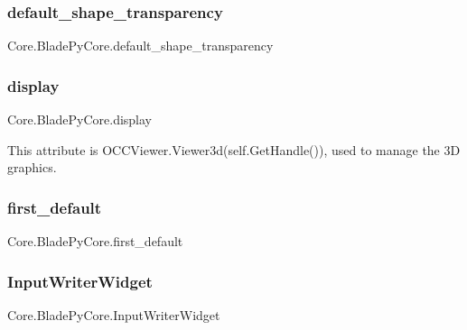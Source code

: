 \hypertarget{a00078_a26accbeb5266ec3f792c86cf8643f696}{}\label{a00078_a26accbeb5266ec3f792c86cf8643f696} 
\subsubsection{\texorpdfstring{default\+\_\+shape\+\_\+transparency}{default\_shape\_transparency}}
{\footnotesize\ttfamily Core.\+Blade\+Py\+Core.\+default\+\_\+shape\+\_\+transparency}

\hypertarget{a00078_abe828f3ea500c70a4abe0f376b6d8dc4}{}\label{a00078_abe828f3ea500c70a4abe0f376b6d8dc4} 
\subsubsection{\texorpdfstring{display}{display}}
{\footnotesize\ttfamily Core.\+Blade\+Py\+Core.\+display}



This attribute is O\+C\+C\+Viewer.\+Viewer3d(self.\+Get\+Handle()), used to manage the 3D graphics. 

\hypertarget{a00078_af0ce94ff8ed058ada4057b3062de1d0d}{}\label{a00078_af0ce94ff8ed058ada4057b3062de1d0d} 
\subsubsection{\texorpdfstring{first\+\_\+default}{first\_default}}
{\footnotesize\ttfamily Core.\+Blade\+Py\+Core.\+first\+\_\+default}

\hypertarget{a00078_a4ead2c1cc874da56fad290cca0630fc0}{}\label{a00078_a4ead2c1cc874da56fad290cca0630fc0} 
\subsubsection{\texorpdfstring{Input\+Writer\+Widget}{InputWriterWidget}}
{\footnotesize\ttfamily Core.\+Blade\+Py\+Core.\+Input\+Writer\+Widget}

